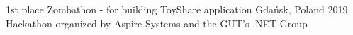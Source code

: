 
\begin{cvhonors}

  \cvhonor
    {1st place} %
    {Zombathon - for building ToyShare application} %
    {Gdańsk, Poland} %
    {2019} %
    {Hackathon organized by Aspire Systems and the GUT's .NET Group} %

 \end{cvhonors}

